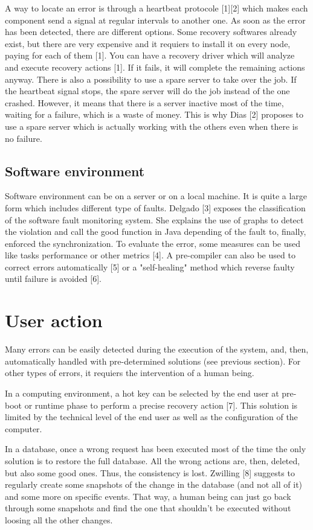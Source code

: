\documentclass[10pt,a4paper]{report}
\begin{document}
A way to locate an error is through a heartbeat protocole [1][2] which makes each component send a signal at regular intervals to another one. As soon as the error has been detected, there are different options. 
Some recovery softwares already exist, but there are very expensive and it requiers to install it on every node, paying for each of them [1].
You can have a recovery driver which will analyze and execute recovery actions [1]. If it fails, it will complete the remaining actions anyway. 
There is also a possibility to use a spare server to take over the job. If the heartbeat signal stops, the spare server will do the job instead of the one crashed. However, it means that there is a server inactive most of the time, waiting for a failure, which is a waste of money. This is why Dias [2] proposes to use a spare server which is actually working with the others even when there is no failure.

		\subsection{Software environment}
Software environment can be on a server or on a local machine. It is quite a large form which includes different type of faults. Delgado [3] exposes the classification of the software fault monitoring system. She explains the use of graphs to detect the violation and call the good function in Java depending of the fault to, finally, enforced the synchronization. To evaluate the error, some measures can be used like tasks performance or other metrics [4]. A pre-compiler can also be used to correct errors automatically [5] or a "self-healing" method which reverse faulty until failure is avoided [6].
		
	\section{User action}	
Many errors can be easily detected during the execution of the system, and, then, automatically handled with pre-determined solutions (see previous section). For other types of errors, it requiers the intervention of a human being. 

In a computing environment, a hot key can be selected by the end user at pre-boot or runtime phase to perform a precise recovery action [7]. This solution is limited by the technical level of the end user as well as the configuration of the computer. 

In a database, once a wrong request has been executed most of the time the only solution is to restore the full database. All the wrong actions are, then, deleted, but also some good ones. Thus, the consistency is lost. Zwilling [8] suggests to regularly create some snapshots of the change in the database (and not all of it) and some more on specific events. That way, a human being can just go back through some snapshots and find the one that shouldn't be executed without loosing all the other changes.
\end{document}
